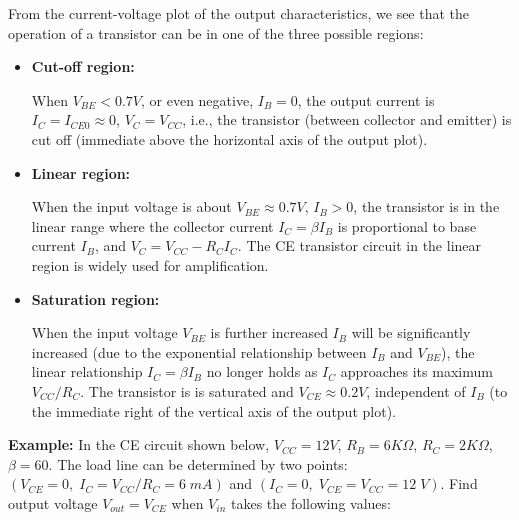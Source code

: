 From the current-voltage plot of the output characteristics, we see that
the operation of a transistor can be in one of the three possible regions:
\begin{itemize}
\item {\bf Cut-off region:} 

  When $V_{BE}<0.7V$, or even negative, $I_B=0$, the output current is
  $I_C=I_{CE0} \approx 0$, $V_C=V_{CC}$, i.e., the transistor (between 
  collector and emitter) is cut off (immediate above the horizontal
  axis of the output plot).

\item {\bf Linear region:} 

  When the input voltage is about $V_{BE}\approx 0.7V$, $I_B>0$, the 
  transistor is in the linear range where the collector current 
  $I_C=\beta I_B$ is proportional to base current $I_B$, and 
  $V_C=V_{CC}-R_CI_C$. The CE transistor circuit in the linear 
  region is widely used for amplification.

\item {\bf Saturation region:} 

  When the input voltage $V_{BE}$ is further increased $I_B$ will be
  significantly increased (due to the exponential relationship between 
  $I_B$ and $V_{BE}$), the linear relationship $I_C=\beta I_B$ no longer 
  holds as $I_C$ approaches its maximum $V_{CC}/R_C$. The transistor is 
  is saturated and $V_{CE}\approx 0.2V$, independent of $I_B$ (to the 
  immediate right of the vertical axis of the output plot).

\end{itemize}

{\bf Example:} In the CE circuit shown below, $V_{CC}=12V$, $R_B=6 K\Omega$,
$R_C=2 K\Omega$, $\beta=60$. The load line can be determined by two points:
$(V_{CE}=0,\;I_C=V_{CC}/R_C=6\;mA)$ and $(I_C=0,\;V_{CE}=V_{CC}=12\;V)$. Find output
voltage $V_{out}=V_{CE}$ when $V_{in}$ takes the following values:


